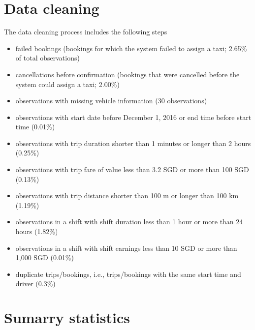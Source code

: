 \documentclass[reviewmode,AEJ]{AEA}
\begin{document}
\begin{appendices}
	
\setcounter{figure}{0}
\renewcommand\thefigure{A\arabic{figure}}
\setcounter{table}{0}
\renewcommand\thetable{A\arabic{table}}


\FloatBarrier

\newpage

\section{Data cleaning}
\label{apx:DataCleaning}
The data cleaning process includes the following steps
\begin{itemize}[noitemsep,nolistsep]
	\item failed bookings (bookings for which the system failed to assign a taxi; 2.65\% of total observations)
	\item cancellations before confirmation (bookings that were cancelled before the system could assign a taxi; 2.00\%)
	\item observations with missing vehicle information (30 observations)
	\item observations with start date before December 1, 2016 or end time before start time (0.01\%)
	\item observations with trip duration shorter than 1 minutes or longer than 2 hours (0.25\%)
	\item observations with trip fare of value less than 3.2 SGD or more than 100 SGD (0.13\%)%
	\item observations with trip distance shorter than 100 m or longer than 100 km (1.19\%)%
	\item observations in a shift with shift duration less than 1 hour or more than 24 hours (1.82\%)
	\item observations in a shift with shift earnings less than 10 SGD or more than 1,000 SGD (0.01\%)%
	\item duplicate trips/bookings, i.e., trips/bookings with the same start time and driver (0.3\%)
\end{itemize}

\section{Sumarry statistics}



\end{appendices}
\end{document}
